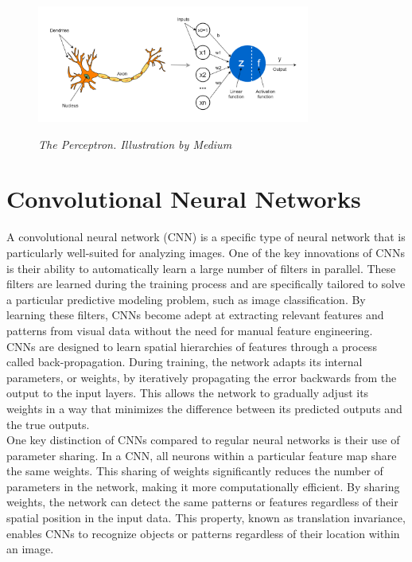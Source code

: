 \begin{figure}[H]
  \centering
  \includegraphics[width=0.8\textwidth]{imatges/preliminaries/perceptron.png}
  \caption[The Perceptron]{\textit{The Perceptron. Illustration by Medium}}
  {\label{fig:perceptron}}
\end{figure}

\newpage

\section{Convolutional Neural Networks}

A convolutional neural network (CNN) is a specific type of neural network that
is particularly well-suited for analyzing images. One of the key innovations of
CNNs is their ability to automatically learn a large number of filters in
parallel. These filters are learned during the training process and are
specifically tailored to solve a particular predictive modeling problem, such
as image classification. By learning these filters, CNNs become adept at
extracting relevant features and patterns from visual data without the need for
manual feature engineering. \\

CNNs are designed to learn spatial hierarchies of features through a process
called back-propagation. During training, the network adapts its internal
parameters, or weights, by iteratively propagating the error backwards from the
output to the input layers. This allows the network to gradually adjust its
weights in a way that minimizes the difference between its predicted outputs
and the true outputs. \\

One key distinction of CNNs compared to regular neural networks is their use of
parameter sharing. In a CNN, all neurons within a particular feature map share
the same weights. This sharing of weights significantly reduces the number of
parameters in the network, making it more computationally efficient. By sharing
weights, the network can detect the same patterns or features regardless of
their spatial position in the input data. This property, known as translation
invariance, enables CNNs to recognize objects or patterns regardless of their
location within an image.\\

